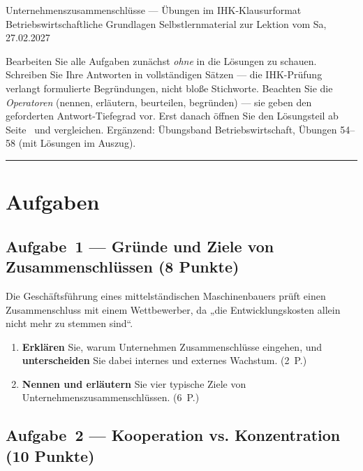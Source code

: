 \documentclass[11pt, a4paper]{article}
\begin{document}
%
  {Unternehmenszusammenschlüsse --- Übungen im IHK-Klausurformat}%
  {Betriebswirtschaftliche Grundlagen}%
  {Selbstlernmaterial zur Lektion vom Sa, 27.02.2027}


\begin{merksatz}[title={\bfseries So nutzen Sie dieses Aufgabenheft}]
Bearbeiten Sie alle Aufgaben zunächst \emph{ohne} in die Lösungen zu schauen. Schreiben
Sie Ihre Antworten in vollständigen Sätzen --- die IHK-Prüfung verlangt formulierte
Begründungen, nicht bloße Stichworte. Beachten Sie die \emph{Operatoren} (nennen,
erläutern, beurteilen, begründen) --- sie geben den geforderten Antwort-Tiefegrad vor.
Erst danach öffnen Sie den Lösungsteil ab Seite~\pageref{loesungen} und vergleichen.
Ergänzend: Übungsband Betriebswirtschaft, Übungen 54--58 (mit Lösungen im Auszug).
\end{merksatz}

\tableofcontents
\vspace{1em}
\hrule

\section{Aufgaben}

\subsection*{Aufgabe~1 --- Gründe und Ziele von Zusammenschlüssen (8 Punkte)}

Die Geschäftsführung eines mittelständischen Maschinenbauers prüft einen Zusammenschluss
mit einem Wettbewerber, da „die Entwicklungskosten allein nicht mehr zu stemmen sind``.

\begin{enumerate}[label=(\alph*)]
  \item \textbf{Erklären} Sie, warum Unternehmen Zusammenschlüsse eingehen, und
    \textbf{unterscheiden} Sie dabei internes und externes Wachstum. \hfill (2~P.)
  \item \textbf{Nennen und erläutern} Sie vier typische Ziele von
    Unternehmenszusammenschlüssen. \hfill (6~P.)
\end{enumerate}

\subsection*{Aufgabe~2 --- Kooperation vs. Konzentration (10 Punkte)}
\end{document}
